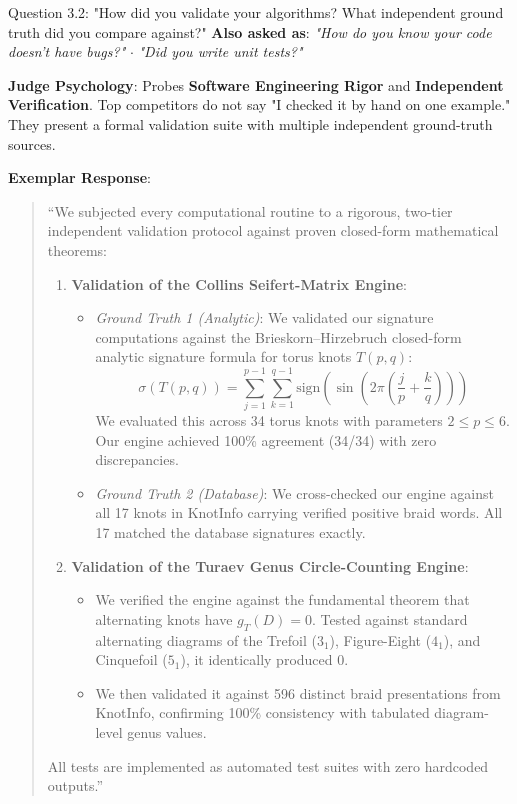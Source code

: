 \documentclass[11pt,letterpaper]{article}
\begin{document}
\vspace{1em}

\begin{questionbox}{Question 3.2: "How did you validate your algorithms? What independent ground truth did you compare against?"}
\textbf{Also asked as}: \textit{"How do you know your code doesn't have bugs?"} $\cdot$ \textit{"Did you write unit tests?"}
\end{questionbox}

\begin{strategybox}
\textbf{Judge Psychology}: Probes \textbf{Software Engineering Rigor} and \textbf{Independent Verification}. Top competitors do not say "I checked it by hand on one example." They present a formal validation suite with multiple independent ground-truth sources.
\end{strategybox}

\begin{exemplarbox}
\textbf{Exemplar Response}:
\begin{quote}
``We subjected every computational routine to a rigorous, two-tier independent validation protocol against proven closed-form mathematical theorems:
\begin{enumerate}
    \item \textbf{Validation of the Collins Seifert-Matrix Engine}:
    \begin{itemize}
        \item \textit{Ground Truth 1 (Analytic)}: We validated our signature computations against the Brieskorn--Hirzebruch closed-form analytic signature formula for torus knots $T(p,q)$:
        $$\sigma(T(p,q)) = \sum_{j=1}^{p-1} \sum_{k=1}^{q-1} \text{sign}\left(\sin\left(2\pi\left(\frac{j}{p} + \frac{k}{q}\right)\right)\right)$$
        We evaluated this across 34 torus knots with parameters $2 \leq p \leq 6$. Our engine achieved 100\% agreement (34/34) with zero discrepancies.
        \item \textit{Ground Truth 2 (Database)}: We cross-checked our engine against all 17 knots in KnotInfo carrying verified positive braid words. All 17 matched the database signatures exactly.
    \end{itemize}
    \item \textbf{Validation of the Turaev Genus Circle-Counting Engine}:
    \begin{itemize}
        \item We verified the engine against the fundamental theorem that alternating knots have $g_T(D) = 0$. Tested against standard alternating diagrams of the Trefoil ($3_1$), Figure-Eight ($4_1$), and Cinquefoil ($5_1$), it identically produced 0.
        \item We then validated it against 596 distinct braid presentations from KnotInfo, confirming 100\% consistency with tabulated diagram-level genus values.
    \end{itemize}
\end{enumerate}
All tests are implemented as automated test suites with zero hardcoded outputs.''
\end{quote}
\end{exemplarbox}
\end{document}
